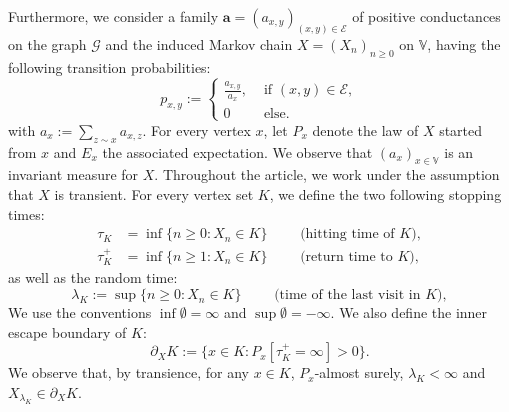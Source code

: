 \documentclass[12pt,a4paper]{article}
\newcommand{\1}[1]{{\mathbf 1}{\{#1\}}}
\newcommand{\8}{{\infty}}
\begin{document}
Furthermore, we consider a family $\mathbf{a}=(a_{x,y})_{(x,y)\in \mathcal{E}}$ of positive conductances on the graph $\mathcal{G}$ and the induced Markov chain $X=(X_n)_{n\ge 0}$ on $\mathbb{V}$, having the following transition probabilities:
\begin{equation}
  p_{x,y}:=
  \begin{cases}
  \frac{a_{x,y}}{a_x}, & \text{ if } (x,y)\in \mathcal{E}, \\
  0 &  \text{ else}.
  \end{cases}
\end{equation}
with $a_x:=\sum_{z\sim x} a_{x,z}$. 
For every vertex $x$, let $P_x$ denote the law of $X$ started from $x$ and $E_x$ the associated expectation. 
We observe that $(a_x)_{x\in \mathbb{V}}$ is an invariant measure for $X$. Throughout the article, we work under the assumption that $X$ is transient.
For every vertex set $K$, we define the two following stopping times:
\begin{equation}
\begin{aligned}
  \tau_K & = \inf \{n\geq 0 : X_n \in K \} \qquad \text{ (hitting time of } K), \\
  \tau^+_K & = \inf \{n\geq 1 : X_n \in K \}  \qquad\text{ (return time to } K),
\end{aligned}
\end{equation}
as well as the random time:
$$\lambda_K := \sup \{n\ge 0 : X_n \in K\}  \qquad \text{ (time of the last visit in } K),$$
We use the conventions $\inf \emptyset = \infty$ and $\sup \emptyset = -\infty$.
We also define the inner escape boundary of $K$:
\begin{equation}
  \partial_X K :=\{x \in K : P_x[\tau_K^+=\infty]>0\}.
\end{equation}%
We observe that, by transience, for any $x\in K$, $P_x$-almost surely, $\lambda_K<\infty$ and $X_{\lambda_K}\in \partial_X K$. 

\medskip
\end{document}
